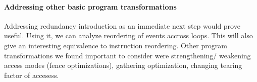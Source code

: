     \paragraph{Addressing other basic program transformations}
        Addressing redundancy introduction as an immediate next step would prove useful.
        Using it, we can analyze reordering of events accross loops. 
        This will also give an interesting equivalence to instruction reordering. 
        Other program transformations we found important to consider were strengthening/ weakening access modes (fence optimizations), gathering optimization, changing tearing factor of accesess. 
    
    